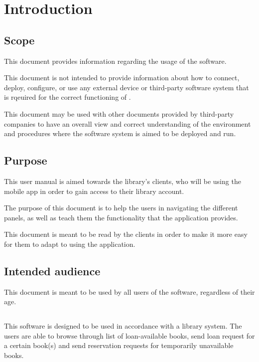 \chapter{Introduction}
\label{chap:introduction}

\section{Scope}

This document provides information regarding the usage of the \mysystemname
software.
 
This document is not intended to provide information about how to
 connect, deploy, configure, or use any external device or
 third-party software system that is rqeuired for the correct functioning of
 \mysystemname.

This document may be used with other documents provided by third-party
 companies to have an overall view and correct understanding of the environment
 and procedures where the software system \mysystemname is aimed to be deployed
 and run.


\section{Purpose}

This user manual is aimed towards the library's clients, who will be using the
mobile app in order to gain access to their library account.

The purpose of this document is to help the users in navigating the different
panels, as well as teach them the functionality that the application provides.

This document is meant to be read by the clients in order to make it more easy
for them to adapt to using the application.



\section{Intended audience}
This document is meant to be used by all users of the \mysystemname software,
regardless of their age.


\section{\mysystemname}
This software is designed to be used in accordance with a library system.
The users are able to browse through list of loan-available books, send loan
request for a certain book(s) and send reservation requests for temporarily
unavailable books. 


